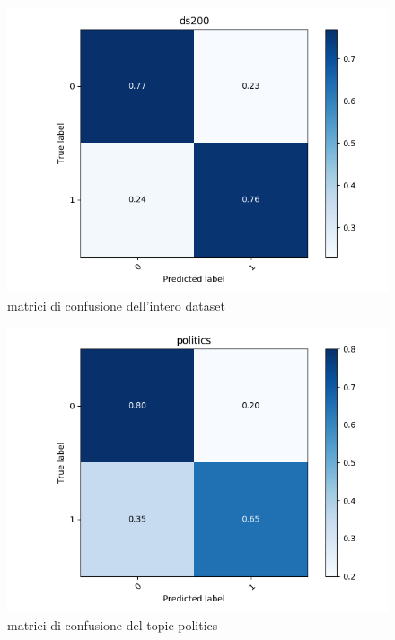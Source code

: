\begin{figure}[h!t]
    \centering
    \includegraphics{Figure/confMatr/mtr_ds200.png}
    \caption{matrici di confusione dell'intero dataset}
    \label{fig:mtrconf_sim_200}
\end{figure}
\FloatBarrier

\begin{figure}[h!t]
    \centering
    \includegraphics{Figure/confMatr/mtr_politics.png}
    \caption{matrici di confusione del topic politics}
    \label{fig:mtrconf_sim_p}
\end{figure}
\FloatBarrier

